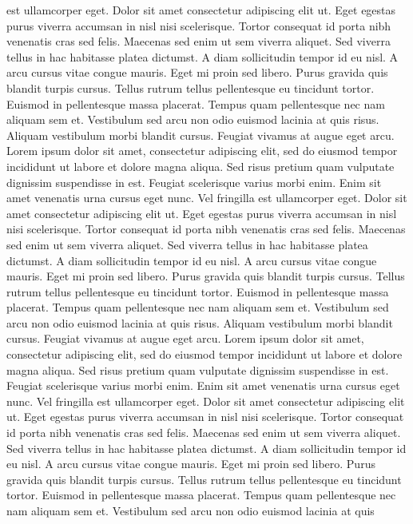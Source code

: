  est ullamcorper eget. Dolor sit amet consectetur adipiscing elit ut.
Eget egestas purus viverra accumsan in nisl nisi scelerisque. Tortor
consequat id porta nibh venenatis cras sed felis. Maecenas sed enim ut
sem viverra aliquet. Sed viverra tellus in hac habitasse platea
dictumst. A diam sollicitudin tempor id eu nisl. A arcu cursus vitae
congue mauris. Eget mi proin sed libero. Purus gravida quis blandit
turpis cursus. Tellus rutrum tellus pellentesque eu tincidunt tortor.
Euismod in pellentesque massa placerat. Tempus quam pellentesque nec nam
 aliquam sem et. Vestibulum sed arcu non odio euismod lacinia at quis
risus. Aliquam vestibulum morbi blandit cursus. Feugiat vivamus at augue
 eget arcu.
Lorem
 ipsum dolor sit amet, consectetur adipiscing elit, sed do eiusmod
tempor incididunt ut labore et dolore magna aliqua. Sed risus pretium
quam vulputate dignissim suspendisse in est. Feugiat scelerisque varius
morbi enim. Enim sit amet venenatis urna cursus eget nunc. Vel fringilla
 est ullamcorper eget. Dolor sit amet consectetur adipiscing elit ut.
Eget egestas purus viverra accumsan in nisl nisi scelerisque. Tortor
consequat id porta nibh venenatis cras sed felis. Maecenas sed enim ut
sem viverra aliquet. Sed viverra tellus in hac habitasse platea
dictumst. A diam sollicitudin tempor id eu nisl. A arcu cursus vitae
congue mauris. Eget mi proin sed libero. Purus gravida quis blandit
turpis cursus. Tellus rutrum tellus pellentesque eu tincidunt tortor.
Euismod in pellentesque massa placerat. Tempus quam pellentesque nec nam
 aliquam sem et. Vestibulum sed arcu non odio euismod lacinia at quis
risus. Aliquam vestibulum morbi blandit cursus. Feugiat vivamus at augue
 eget arcu.
Lorem
 ipsum dolor sit amet, consectetur adipiscing elit, sed do eiusmod
tempor incididunt ut labore et dolore magna aliqua. Sed risus pretium
quam vulputate dignissim suspendisse in est. Feugiat scelerisque varius
morbi enim. Enim sit amet venenatis urna cursus eget nunc. Vel fringilla
 est ullamcorper eget. Dolor sit amet consectetur adipiscing elit ut.
Eget egestas purus viverra accumsan in nisl nisi scelerisque. Tortor
consequat id porta nibh venenatis cras sed felis. Maecenas sed enim ut
sem viverra aliquet. Sed viverra tellus in hac habitasse platea
dictumst. A diam sollicitudin tempor id eu nisl. A arcu cursus vitae
congue mauris. Eget mi proin sed libero. Purus gravida quis blandit
turpis cursus. Tellus rutrum tellus pellentesque eu tincidunt tortor.
Euismod in pellentesque massa placerat. Tempus quam pellentesque nec nam
 aliquam sem et. Vestibulum sed arcu non odio euismod lacinia at quis
